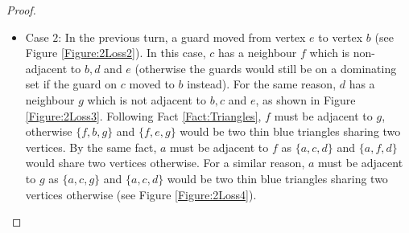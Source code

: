 \documentclass[11pt]{article}
\begin{document}
\begin{proof}
\begin{itemize}
\begin{figure}[h!]
\begin{subfigure}[b]{0.3\textwidth}
					\caption{}
					\label{Figure:Loss2}
				\end{subfigure}
				\hfill
				\begin{subfigure}[b]{0.3\textwidth}
					\centering
					
					\caption{}
					\label{Figure:Loss3}
				\end{subfigure}
				
				\caption{Configuration of the guards in Case $1$ of the proof of Proposition \ref{Proposition:SmallestGraph}.}
				\label{Figure:GuardsConfiguration}
			\end{figure}
			
			\item Case $2$: In the previous turn, a guard moved from vertex $e$ to vertex $b$ (see Figure \ref{Figure:2Loss2}). In this case, $c$ has a neighbour $f$ which is non-adjacent to $b, d$ and $e$ (otherwise the guards would still be on a dominating set if the guard on $c$ moved to $b$ instead). For the same reason, $d$ has a neighbour $g$ which is not adjacent to $b, c$ and $e$, as shown in Figure \ref{Figure:2Loss3}. Following Fact \ref{Fact:Triangles}, $f$ must be adjacent to $g$, otherwise $\{f,b,g\}$ and $\{f,e,g\}$ would be two thin blue triangles sharing two vertices. By the same fact, $a$ must be adjacent to $f$ as $\{a,c,d\}$ and $\{a,f,d\}$ would share two vertices otherwise. For a similar reason, $a$ must be adjacent to $g$ as $\{a,c,g\}$ and $\{a,c,d\}$ would be two thin blue triangles sharing two vertices otherwise (see Figure \ref{Figure:2Loss4}).
			

\end{itemize}
\end{proof}
\end{document}

